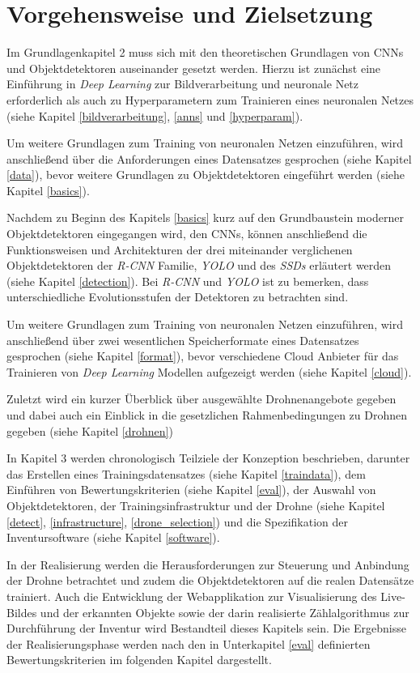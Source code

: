 \section{Vorgehensweise und Zielsetzung}

Im Grundlagenkapitel 2 muss sich mit den theoretischen Grundlagen von CNNs und Objektdetektoren auseinander gesetzt werden. Hierzu ist zunächst eine Einführung in \textit{Deep Learning} zur Bildverarbeitung und neuronale Netz erforderlich als auch zu Hyperparametern zum Trainieren eines neuronalen Netzes (siehe Kapitel \ref{bildverarbeitung}, \ref{anns} und \ref{hyperparam}).

Um weitere Grundlagen zum Training von neuronalen Netzen einzuführen, wird anschließend über die Anforderungen eines Datensatzes gesprochen (siehe Kapitel \ref{data}), bevor weitere Grundlagen zu Objektdetektoren eingeführt werden (siehe Kapitel \ref{basics}). 

Nachdem zu Beginn des Kapitels \ref{basics} kurz auf den Grundbaustein moderner Objektdetektoren eingegangen wird, den CNNs, können anschließend die Funktionsweisen und Architekturen der drei miteinander verglichenen Objektdetektoren der \textit{R-CNN} Familie, \textit{YOLO} und des \textit{SSDs} erläutert werden (siehe Kapitel \ref{detection}). Bei \textit{R-CNN} und \textit{YOLO} ist zu bemerken, dass unterschiedliche Evolutionsstufen der Detektoren zu betrachten sind.

Um weitere Grundlagen zum Training von neuronalen Netzen einzuführen, wird anschließend über zwei wesentlichen Speicherformate eines Datensatzes gesprochen (siehe Kapitel \ref{format}), bevor verschiedene Cloud Anbieter für das Trainieren von \textit{Deep Learning} Modellen aufgezeigt werden (siehe Kapitel \ref{cloud}). 

Zuletzt wird ein kurzer Überblick über ausgewählte Drohnenangebote gegeben und dabei auch ein Einblick in die gesetzlichen Rahmenbedingungen zu Drohnen gegeben (siehe Kapitel \ref{drohnen})

In Kapitel 3 werden chronologisch Teilziele der Konzeption beschrieben, darunter das Erstellen eines Trainingsdatensatzes (siehe Kapitel \ref{traindata}), dem Einführen von Bewertungskriterien (siehe Kapitel \ref{eval}), der Auswahl von Objektdetektoren, der Trainingsinfrastruktur und der Drohne (siehe Kapitel \ref{detect}, \ref{infrastructure}, \ref{drone_selection}) und die Spezifikation der Inventursoftware (siehe Kapitel \ref{software}).

In der Realisierung werden die Herausforderungen zur Steuerung und Anbindung der Drohne betrachtet und zudem die Objektdetektoren auf die realen Datensätze trainiert. Auch die Entwicklung der Webapplikation zur Visualisierung des Live-Bildes und der erkannten Objekte sowie der darin realisierte Zählalgorithmus zur Durchführung der Inventur wird Bestandteil dieses Kapitels sein. Die Ergebnisse der Realisierungsphase werden nach den in Unterkapitel \ref{eval} definierten Bewertungskriterien im folgenden Kapitel dargestellt. 

